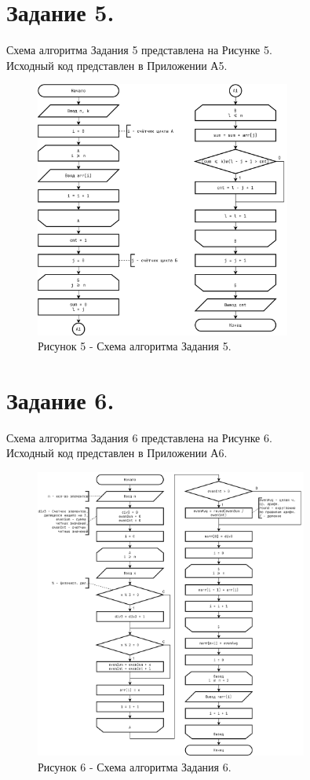 \documentclass[oneside,a4paper,14pt]{extarticle}
\begin{document}
\section*{Задание 5.}
\noindent Схема алгоритма Задания 5 представлена на Рисунке 5.\\
\noindent Исходный код представлен в Приложении А5. \\

\begin{figure}[!ht]
	\centering
	\includegraphics[width=0.75\textwidth]{pics/flowchart-17.png}
	\caption*{Рисунок 5 - Схема алгоритма Задания 5.}
\end{figure}

\section*{Задание 6.}
\noindent Схема алгоритма Задания 6 представлена на Рисунке 6.\\
\noindent Исходный код представлен в Приложении А6. \\
\newpage
\begin{figure}[!ht]
	\centering
	\includegraphics[width=0.8\textwidth]{pics/flowchart-18.png}
	\caption*{Рисунок 6 - Схема алгоритма Задания 6.}
\end{figure}
\end{document}
